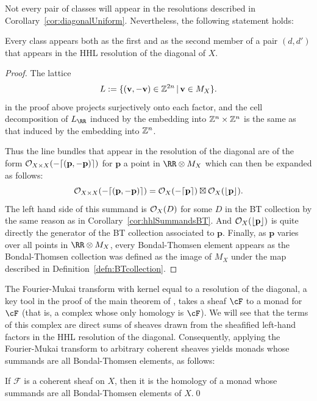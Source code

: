 \documentclass{amsart}
\begin{document}
Not every pair of \BT classes will appear in the resolutions described in Corollary~\ref{cor:diagonalUniform}.
Nevertheless, the following statement holds:
\begin{cor}\label{cor:diagonal-BTcollection}
Every \BT class appears both as the first and as the second member of a pair $(d,d')$ that appears in the HHL resolution of the diagonal of $X$. \end{cor}
\begin{proof}
The lattice 
\[
L := \{(\mathbf{v},-\mathbf{v}) \in \mathbb Z^{2n} \,|\, \mathbf{v}\in M_X\}.
\] 
in the proof above projects surjectively onto each factor, and the cell decomposition of $L_{\RR}$
induced by the embedding into $\mathbb Z^{n}\times \mathbb Z^{n}$ is the same as that induced by the embedding into
$\mathbb Z^{n}$.
  
  Thus the line bundles that appear in the resolution of the diagonal are of the form ${\mathcal O}_{X\times X}(-\lceil (\mathbf{p},-\mathbf{p})\rceil)$ for $\mathbf{p}$ a point in $\RR \otimes M_X$ which can then be expanded as follows:
  \[{\mathcal O}_{X\times X}(-\lceil (\mathbf{p},-\mathbf{p})\rceil)={\mathcal O}_X(-\lceil \mathbf{p}\rceil)\boxtimes {\mathcal O}_X(\lfloor \mathbf{p}\rfloor).\]
  The left hand side of this summand is ${\mathcal O}_X(D)$ for some $D$ in the BT collection by the same reason as in Corollary~\ref{cor:hhlSummandsBT}. And ${\mathcal O}_X(\lfloor \mathbf{p}\rfloor)$ is quite directly the generator of the BT collection associated to $\mathbf{p}$. Finally, as $\mathbf{p}$ varies over all points in $\RR \otimes M_X$, every Bondal-Thomsen element appears as the Bondal-Thomsen collection was defined as the image of $M_X$ under the map described in Definition~\ref{defn:BTcollection}.
\end{proof}

The Fourier-Mukai transform with kernel equal to a resolution of the diagonal,  a key tool in the proof of the main theorem of \cite{BES20}, takes a sheaf $\cF$ to a monad for $\cF$ (that is, a complex whose only homology is $\cF$).  We will see  that the terms of this complex are direct sums of sheaves
 drawn from the sheafified left-hand factors in the HHL resolution of the diagonal. Consequently, applying the Fourier-Mukai transform to arbitrary coherent sheaves yields monads whose summands are all Bondal-Thomsen elements, as follows:

\begin{cor}
  If $\mathcal{F}$ is a coherent sheaf on $X$, then it is the homology of a monad whose summands are all Bondal-Thomsen elements of $X$.\qed
\end{cor}
\end{document}
